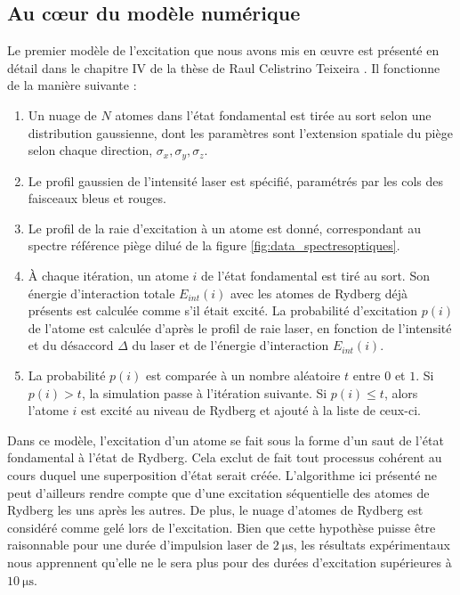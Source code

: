 	\subsection{Au c\oe ur du modèle numérique}\label{subsec:algo_1}
\noindent Le premier modèle de l'excitation que nous avons mis en \oe uvre est présenté en détail dans le chapitre IV de la thèse de Raul Celistrino Teixeira \cite{PHD_CELISTRINO}.
Il fonctionne de la manière suivante :
\begin{enumerate}
	\item Un nuage de $N$ atomes dans l'état fondamental est tirée au sort selon une distribution gaussienne, dont les paramètres sont l'extension spatiale du piège selon chaque direction, $\sigma_x,\sigma_y,\sigma_z$.
	\item Le profil gaussien de l'intensité laser est spécifié, paramétrés par les cols des faisceaux bleus et rouges.
	\item Le profil de la raie d'excitation à un atome est donné, correspondant au spectre \og référence piège dilué \fg{} de la figure \eqref{fig:data_spectresoptiques}.
	\item \`A chaque itération, un atome $i$ de l'état fondamental est tiré au sort.
	Son énergie d'interaction totale $E_{int}(i)$ avec les atomes de Rydberg déjà présents est calculée comme s'il était excité.
	La probabilité d'excitation $p(i)$ de l'atome est calculée d'après le profil de raie laser, en fonction de l'intensité  et du désaccord $\Delta$ du laser et de l'énergie d'interaction $E_{int}(i)$.
	\item La probabilité $p(i)$ est comparée à un nombre aléatoire $t$ entre $0$ et $1$. Si $p(i)>t$, la simulation passe à l'itération suivante.
	Si $p(i)\leq t$, alors l'atome $i$ est excité au niveau de Rydberg et ajouté à la liste de ceux-ci.
\end{enumerate}
%
Dans ce modèle, l'excitation d'un atome se fait sous la forme d'un \og saut \fg{} de l'état fondamental à l'état de Rydberg.
Cela exclut de fait tout processus cohérent au cours duquel une superposition d'état serait créée.
L'algorithme ici présenté ne peut d'ailleurs rendre compte que d'une excitation séquentielle des atomes de Rydberg les uns après les autres.
De plus, le nuage d'atomes de Rydberg est considéré comme gelé lors de l'excitation.
Bien que cette hypothèse puisse être raisonnable pour une durée d'impulsion laser de $\SI{2}{\us}$, les résultats expérimentaux nous apprennent qu'elle ne le sera plus pour des durées d'excitation supérieures à $\SI{10}{\us}$.

